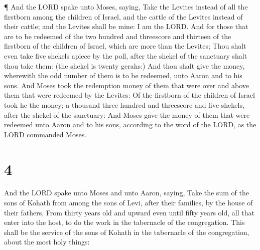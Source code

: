  ¶ And the LORD spake unto Moses, saying, 
Take the Levites instead of all the firstborn among the children of
Israel, and the cattle of the Levites instead of their cattle; and the
Levites shall be mine: I am the LORD.  And for those that
are to be redeemed of the two hundred and threescore and thirteen of the
firstborn of the children of Israel, which are more than the Levites;
 Thou shalt even take five shekels apiece by the poll,
after the shekel of the sanctuary shalt thou take them: (the shekel is
twenty gerahs:)  And thou shalt give the money, wherewith
the odd number of them is to be redeemed, unto Aaron and to his sons.
 And Moses took the redemption money of them that were over
and above them that were redeemed by the Levites:  Of the
firstborn of the children of Israel took he the money; a thousand three
hundred and threescore and five shekels, after the shekel of the
sanctuary:  And Moses gave the money of them that were
redeemed unto Aaron and to his sons, according to the word of the LORD,
as the LORD commanded Moses.

\hypertarget{section-3}{%
\section{4}\label{section-3}}

 And the LORD spake unto Moses and unto Aaron, saying,
 Take the sum of the sons of Kohath from among the sons of
Levi, after their families, by the house of their fathers, 
From thirty years old and upward even until fifty years old, all that
enter into the host, to do the work in the tabernacle of the
congregation.  This shall be the service of the sons of
Kohath in the tabernacle of the congregation, about the most holy
things:

